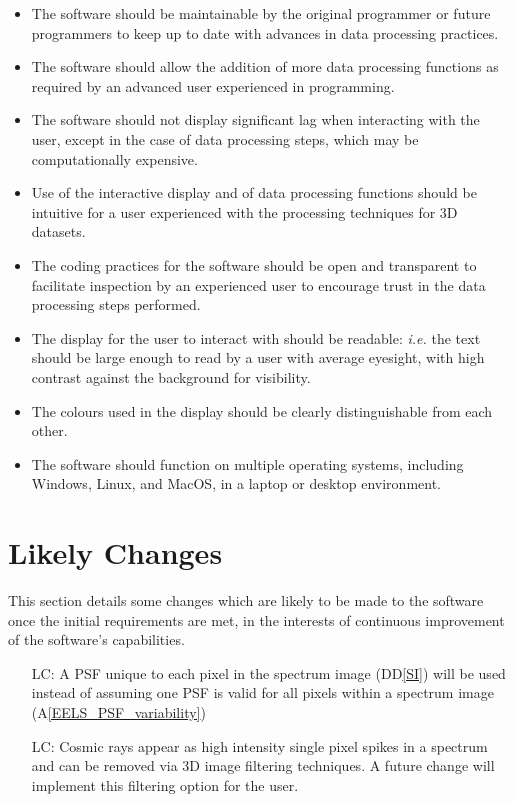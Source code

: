 \documentclass[12pt]{article}
\newcommand{\ddref}[1]{DD\ref{#1}}
\newcommand{\aref}[1]{A\ref{#1}}
\newcounter{lcnum} %
\begin{document}
\begin{itemize}
	\item The software should be maintainable by the original programmer or future
programmers to keep up to date with advances in data processing practices.
	\item The software should allow the addition of more data processing functions
as required by an advanced user experienced in programming.
	\item The software should not display significant lag when interacting with the
user, except in the case of data processing steps, which may be computationally
expensive.
	\item Use of the interactive display and of data processing functions should be
intuitive for a user experienced with the processing techniques for 3D datasets.
	\item The coding practices for the software should be open and transparent to
facilitate inspection by an experienced user to encourage trust in the data
processing steps performed.
	\item The display for the user to interact with should be readable:
\textit{i.e.} the text should be large enough to read by a user with average
eyesight, with high contrast against the background for visibility.
	\item The colours used in the display should be clearly distinguishable from
each other.
	\item The software should function on multiple operating systems, including
Windows, Linux, and MacOS, in a laptop or desktop environment.
\end{itemize}

\section{Likely Changes}
	This section details some changes which are likely to be made to the software
once the initial requirements are met, in the interests of continuous
improvement of the software's capabilities.
	\noindent \begin{itemize}
		\item[LC\refstepcounter{lcnum}\thelcnum\label{LC_identicalPSF}:] A PSF unique
to each pixel in the spectrum image (\ddref{SI}) will be used instead of
assuming one PSF is valid for all pixels within a spectrum image
(\aref{EELS_PSF_variability})
		\item[LC\refstepcounter{lcnum}\thelcnum\label{LC_identicalPSF}:] Cosmic rays
appear as high intensity single pixel spikes in a spectrum and can be removed
via 3D image filtering techniques. A future change will implement this filtering
option for the user. 
	\end{itemize}
\end{document}
